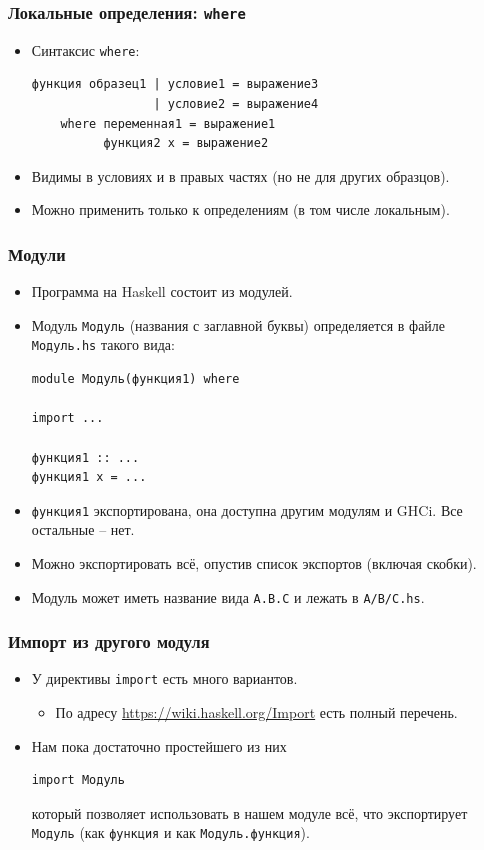 \documentclass[11pt]{beamer}
\begin{document}
\begin{frame}[fragile]
\frametitle{Локальные определения: \lstinline[basicstyle=\ttfamily]|where|}
\begin{itemize}
    \item Синтаксис \lstinline|where|:
\begin{lstlisting}
функция образец1 | условие1 = выражение3
                 | условие2 = выражение4
    where переменная1 = выражение1
          функция2 x = выражение2
\end{lstlisting}
    \item Видимы в условиях и в правых частях (но не для других образцов).
    \item Можно применить только к определениям (в том числе локальным).
\end{itemize}
\end{frame}

\begin{frame}[fragile]
\frametitle{Модули}
\begin{itemize}
    \item Программа на Haskell состоит из модулей.
    \item Модуль \lstinline|Модуль| (названия с заглавной буквы) определяется в файле \lstinline|Модуль.hs| такого вида:
\begin{lstlisting}
module Модуль(функция1) where

import ...

функция1 :: ...
функция1 x = ...
\end{lstlisting}
\item \lstinline|функция1| экспортирована, она доступна другим модулям и GHCi. Все остальные -- нет.
\item Можно экспортировать всё, опустив список экспортов (включая скобки).
\item Модуль может иметь название вида \lstinline|A.B.C| и лежать в \lstinline|A/B/C.hs|.
\end{itemize}
\end{frame}

\begin{frame}[fragile]
\frametitle{Импорт из другого модуля}
\begin{itemize}
    \item У директивы \lstinline|import| есть много вариантов.
    \begin{itemize}
        \item По адресу \url{https://wiki.haskell.org/Import} есть полный перечень.
    \end{itemize}
    \item Нам пока достаточно простейшего из них
\begin{lstlisting}
import Модуль
\end{lstlisting}
    который позволяет использовать в нашем модуле всё, что экспортирует \lstinline|Модуль| (как \lstinline|функция| и как \lstinline|Модуль.функция|).
\end{itemize}
\end{frame}
\end{document}
